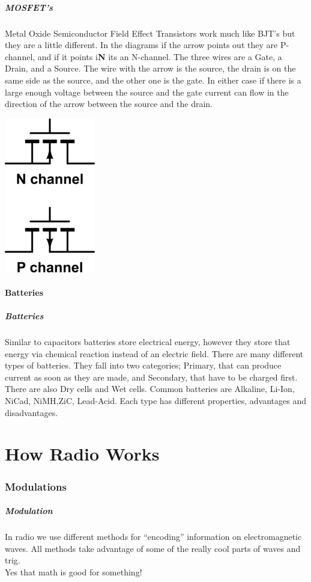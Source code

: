 \documentclass[10pt]{beamer}
\begin{document}
\begin{frame}
\frametitle{MOSFET's}
Metal Oxide Semiconductor Field Effect Transistors work much like BJT's but they are a little different. In the diagrams if the arrow points out they are P-channel, and if it points i\textbf{N} its an N-channel. The three wires are a Gate, a Drain, and a Source. The wire with the arrow is the source, the drain is on the same side as the source, and the other one is the gate. In either case if there is a large enough voltage between the source and the gate current can flow in the direction of the arrow between the source and the drain.
\begin{center}
\includegraphics{mosfets.png}
\end{center}
\end{frame}

\subsection{Batteries}
\begin{frame}
\frametitle{Batteries}
Similar to capacitors batteries store electrical energy, however they store that energy via chemical reaction instead of an electric field. There are many different types of batteries. They fall into two categories; Primary, that can produce current as soon as they are made, and Secondary, that have to be charged first. There are also Dry cells and Wet cells. Common batteries are Alkaline, Li-Ion, NiCad, NiMH,ZiC, Lead-Acid. Each type has different properties, advantages and disadvantages.
\end{frame}

\part{How Radio Works}
\section{Modulations}
\begin{frame}
\frametitle{Modulation}
In radio we use different methods for ``encoding'' information on electromagnetic waves. All methods take advantage of some of the really cool parts of waves and trig.\\
Yes that math is good for something!
\end{frame}
\end{document}
